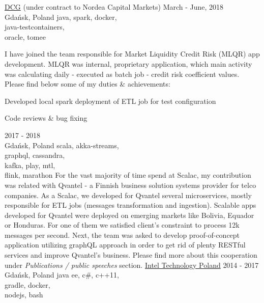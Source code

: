 \documentclass[a4paper,11pt]{cv4tw}%
\begin{document}
      {\href{https://diversecg.pl/}{DCG} (under contract to Nordea Capital Markets)}
      {March - June, 2018\\Gdańsk, Poland}
      {java, spark, docker,\\java-testcontainers,\\oracle, tomee}
      {I have joined the team responsible for Market Liquidity Credit Risk (MLQR) app development.
        MLQR was internal, proprietary application, which main activity was calculating daily - executed as batch job - credit risk coefficient values.
        Please find below some of my duties \& achievements:
        \begin{missions}
        \item Developed local spark deployment of ETL job for test configuration
        \item Code reviews \& bug fixing
        \end{missions}
      }
      {2017 - 2018\\Gdańsk, Poland}
      {scala, akka-streams,\\graphql, cassandra,\\kafka, play, mtl,\\flink, marathon}
      {For the vast majority of time spend at Scalac, my contribution was related with Qvantel - a Finnish business solution systems provider for telco companies.
        As a Scalac, we developed for Qvantel several microservices, mostly responsible for ETL jobs (messages transformation and ingestion).
        Scalable apps developed for Qvantel were deployed on emerging markets like Bolivia, Equador or Honduras. For one of them we satisfied client's constraint
        to process \approx12k messages per second. Next, the team was asked to develop proof-of-concept application utilizing graphQL approach in order to get
        rid of plenty RESTful services and improve Qvantel's business. Please find more about this cooperation under \emph{Publications / public speeches} section.
      }
      {\href{https://www.intel.com/content/www/us/en/jobs/locations/poland.html}
        {Intel Technology Poland}}
      {2014 - 2017\\Gdańsk, Poland}
      {java ee, c\#, c++11,\\gradle, docker,\\nodejs, bash}
\end{document}
